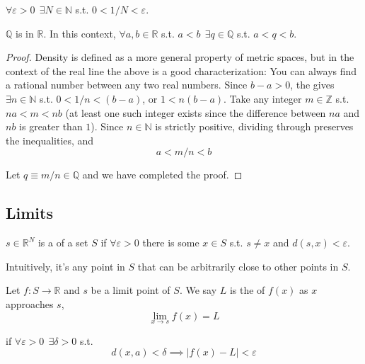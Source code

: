 \documentclass{article}
\begin{document}
\begin{definitionx}\label{def:lecture1_archimedean}
  $\forall \varepsilon > 0 ~~ \exists N \in \mathbb{N}$ s.t. $0 < 1/N < \varepsilon$.
\end{definitionx}

\begin{claim}
  $\mathbb{Q}$ is  in $\mathbb{R}$. In this context, $\forall a, b \in \mathbb{R}$ s.t. $a < b ~~ \exists q \in \mathbb{Q}$ s.t. $a < q < b$.
\end{claim}

\begin{proof}
  Density is defined as a more general property of metric spaces, but in the context of the real line the above is a good characterization: You can always find a rational number between any two real numbers.  Since $b - a > 0$, the  gives $\exists n \in \mathbb{N}$ s.t. $0 < 1/n < (b - a)$, or $1 < n(b - a)$. Take any integer $m \in \mathbb{Z}$ s.t. $na < m < nb$ (at least one such integer exists since the difference between $na$ and $nb$ is greater than $1$). Since $n \in \mathbb{N}$ is strictly positive, dividing  through preserves the inequalities, and
  \[
    a < m/n < b
  \]

  Let $q \equiv m/n \in \mathbb{Q}$ and we have completed the proof.
\end{proof}

\subsection{Limits}
\label{sub:limits}

\begin{definition}
  $s \in \mathbb{R}^N$ is a  of a set $S$ if $\forall \varepsilon > 0$ there is some $x \in S$ s.t. $s \ne x$ and $d(s, x) < \varepsilon$.
\end{definition}

Intuitively, it's any point in $S$ that can be arbitrarily close to other points in $S$.
\begin{definition}
  Let $f: S \to \mathbb{R}$ and $s$ be a limit point of $S$. We say $L$ is the  of $f(x)$ as $x$ approaches $s$,
  \[
    \lim_{x \to s} f(x) = L
  \]

  if $\forall \varepsilon > 0 ~~ \exists \delta > 0$ s.t.
  \[
    d(x, a) < \delta \implies |f(x) - L| < \varepsilon
  \]
\end{definition}
\end{document}
